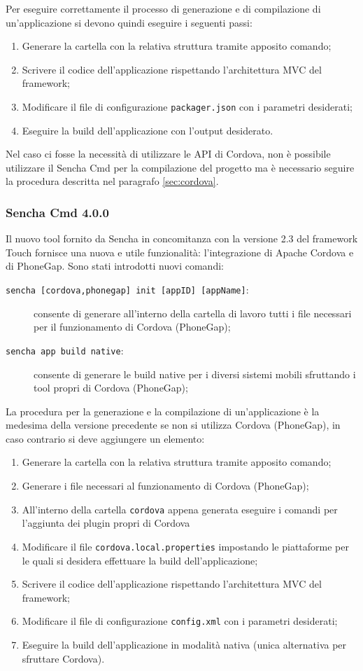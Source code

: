 Per eseguire correttamente il processo di generazione e di compilazione di un'applicazione si devono quindi eseguire i seguenti passi:
\begin{enumerate}
\item Generare la cartella con la relativa struttura tramite apposito comando;
\item Scrivere il codice dell'applicazione rispettando l'architettura MVC del framework;
\item Modificare il file di configurazione \texttt{packager.json} con i parametri desiderati;
\item Eseguire la build dell'applicazione con l'output desiderato.
\end{enumerate}

Nel caso ci fosse la necessità di utilizzare le API di Cordova, non è possibile utilizzare il Sencha Cmd per la compilazione del progetto ma è necessario seguire la procedura descritta nel paragrafo \ref{sec:cordova}.

\subsubsection{Sencha Cmd 4.0.0}
Il nuovo tool fornito da Sencha in concomitanza con la versione 2.3 del framework Touch fornisce una nuova e utile funzionalità: l'integrazione di Apache Cordova e di PhoneGap.
Sono stati introdotti nuovi comandi:
\begin{description}
\item[\texttt{sencha [cordova,phonegap] init [appID] [appName]}:] consente di generare all'interno della cartella di lavoro tutti i file necessari per il funzionamento di Cordova (PhoneGap);
\item[\texttt{sencha app build native}:] consente di generare le build native per i diversi sistemi mobili sfruttando i tool propri di Cordova (PhoneGap);
\end{description}

La procedura per la generazione e la compilazione di un'applicazione è la medesima della versione precedente se non si utilizza Cordova (PhoneGap), in caso contrario si deve aggiungere un elemento:
\begin{enumerate}
\item Generare la cartella con la relativa struttura tramite apposito comando;
\item Generare i file necessari al funzionamento di Cordova (PhoneGap);
\item All'interno della cartella \texttt{cordova} appena generata eseguire i comandi per l'aggiunta dei plugin propri di Cordova
\item Modificare il file \texttt{cordova.local.properties} impostando le piattaforme per le quali si desidera effettuare la build dell'applicazione;
\item Scrivere il codice dell'applicazione rispettando l'architettura MVC del framework;
\item Modificare il file di configurazione \texttt{config.xml} con i parametri desiderati;
\item Eseguire la build dell'applicazione in modalità nativa (unica alternativa per sfruttare Cordova).
\end{enumerate}

